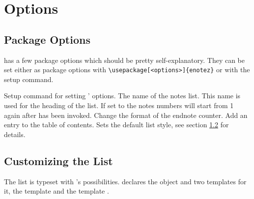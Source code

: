 \documentclass[toc=bib,toc=index]{cnpkgdoc}
\begin{document}
\section{Options}
\subsection{Package Options}
\enotez has a few package options which should be pretty self-explanatory. They
can be set either as package options with \verb=\usepackage[<options>]{enotez}=
or with the setup command.
\begin{beschreibung}
  Setup command for setting \enotez' options.
   The name of the notes list. This name is used for the heading of the list.
   If set to  the notes numbers will start from 1 again after
    has been invoked.
   Change the format of the endnote counter.
   Add an entry to the table of contents.
   Sets the default list style, see section \ref{ssec:customizing_the_list} for
   details.
\end{beschreibung}

\subsection{Customizing the List}\label{ssec:customizing_the_list}
The list is typeset with 's possibilities. \enotez declares
the object  and two templates for it, the template 
and the template .
\end{document}
